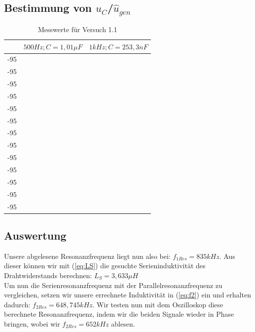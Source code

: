 \documentclass{article}
\begin{document}
\subsection{Bestimmung von $\hat{u}_C$/$\hat{u}_{gen}$}

\begin{table}[h]
  \begin{center}

    \begin{tabular}{|c|c|c|}
      \hline
          & $500Hz; C=1,01\mu F$ & $1kHz; C= 253,3 nF$ \\
      \hline
      -95 &                      &                     \\
      \hline
      -95 &                      &                     \\
      \hline
      -95 &                      &                     \\
      \hline
      -95 &                      &                     \\
      \hline
      -95 &                      &                     \\
      \hline
      -95 &                      &                     \\
      \hline
      -95 &                      &                     \\
      \hline
      -95 &                      &                     \\
      \hline
      -95 &                      &                     \\
      \hline
      -95 &                      &                     \\
      \hline
      -95 &                      &                     \\
      \hline
      -95 &                      &                     \\
      \hline
      -95 &                      &                     \\
      \hline
    \end{tabular}
    \caption{Messwerte für Versuch 1.1}
    \label{tab:MV}
  \end{center}
\end{table}




\subsection{Auswertung}

Unsere abgelesene Resonanzfrequenz liegt nun also bei: $f_{1Res} = 835kHz$.
Aus dieser können wir mit (\ref{eq:LS}) die gesuchte Serieninduktivität des Drahtwiderstands berechnen: $L_S = 3,633\mu H$\\[3pt]
Um nun die Serienresonanzfrequenz mit der Parallelresonanzfrequenz zu vergleichen, setzen wir unsere errechnete Induktivität in
(\ref{eq:f2}) ein und erhalten dadurch: $f_{2Res} = 648,745kHz$. Wir testen nun mit dem Oszilloskop diese berechnete Resonanzfrequenz, indem wir
die beiden Signale wieder in Phase bringen, wobei wir $f_{2Res} = 652kHz$ ablesen.
\end{document}
